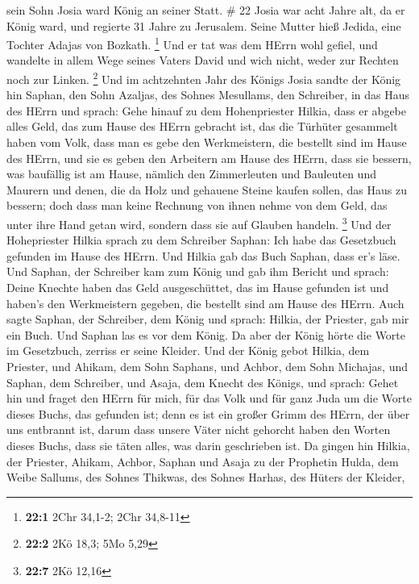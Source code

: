 sein Sohn Josia ward König an seiner Statt. \# 22  Josia war
acht Jahre alt, da er König ward, und regierte 31 Jahre zu Jerusalem.
Seine Mutter hieß Jedida, eine Tochter Adajas von Bozkath. \footnote{\textbf{22:1}
  2Chr 34,1-2; 2Chr 34,8-11}  Und er tat was dem HErrn wohl
gefiel, und wandelte in allem Wege seines Vaters David und wich nicht,
weder zur Rechten noch zur Linken. \footnote{\textbf{22:2} 2Kö 18,3; 5Mo
  5,29}  Und im achtzehnten Jahr des Königs Josia sandte der
König hin Saphan, den Sohn Azaljas, des Sohnes Mesullams, den Schreiber,
in das Haus des HErrn und sprach:  Gehe hinauf zu dem
Hohenpriester Hilkia, dass er abgebe alles Geld, das zum Hause des HErrn
gebracht ist, das die Türhüter gesammelt haben vom Volk, 
dass man es gebe den Werkmeistern, die bestellt sind im Hause des HErrn,
und sie es geben den Arbeitern am Hause des HErrn, dass sie bessern, was
baufällig ist am Hause,  nämlich den Zimmerleuten und
Bauleuten und Maurern und denen, die da Holz und gehauene Steine kaufen
sollen, das Haus zu bessern;  doch dass man keine Rechnung
von ihnen nehme von dem Geld, das unter ihre Hand getan wird, sondern
dass sie auf Glauben handeln. \footnote{\textbf{22:7} 2Kö 12,16}
 Und der Hohepriester Hilkia sprach zu dem Schreiber Saphan:
Ich habe das Gesetzbuch gefunden im Hause des HErrn. Und Hilkia gab das
Buch Saphan, dass er's läse.  Und Saphan, der Schreiber kam
zum König und gab ihm Bericht und sprach: Deine Knechte haben das Geld
ausgeschüttet, das im Hause gefunden ist und haben's den Werkmeistern
gegeben, die bestellt sind am Hause des HErrn.  Auch sagte
Saphan, der Schreiber, dem König und sprach: Hilkia, der Priester, gab
mir ein Buch. Und Saphan las es vor dem König.  Da aber der
König hörte die Worte im Gesetzbuch, zerriss er seine Kleider.
 Und der König gebot Hilkia, dem Priester, und Ahikam, dem
Sohn Saphans, und Achbor, dem Sohn Michajas, und Saphan, dem Schreiber,
und Asaja, dem Knecht des Königs, und sprach:  Gehet hin
und fraget den HErrn für mich, für das Volk und für ganz Juda um die
Worte dieses Buchs, das gefunden ist; denn es ist ein großer Grimm des
HErrn, der über uns entbrannt ist, darum dass unsere Väter nicht
gehorcht haben den Worten dieses Buchs, dass sie täten alles, was darin
geschrieben ist.  Da gingen hin Hilkia, der Priester,
Ahikam, Achbor, Saphan und Asaja zu der Prophetin Hulda, dem Weibe
Sallums, des Sohnes Thikwas, des Sohnes Harhas, des Hüters der Kleider,
